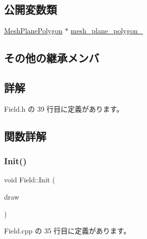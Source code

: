 \subsection*{公開変数類}
\begin{DoxyCompactItemize}
\item 
\mbox{\hyperlink{class_mesh_plane_polygon}{Mesh\+Plane\+Polygon}} $\ast$ \mbox{\hyperlink{class_field_a5c4ad4d2fea2269e7ab2185cf09beb10}{mesh\+\_\+plane\+\_\+polygon\+\_\+}}
\end{DoxyCompactItemize}
\subsection*{その他の継承メンバ}


\subsection{詳解}


 Field.\+h の 39 行目に定義があります。



\subsection{関数詳解}
\mbox{\label{class_field_a8360ab68eaf346984eab8bce4c37c3b3}} 
\subsubsection{\texorpdfstring{Init()}{Init()}}
{\footnotesize\ttfamily void Field\+::\+Init (\begin{DoxyParamCaption}\item[{\mbox{\hyperlink{class_draw_base}{Draw\+Base}} $\ast$}]{draw }\end{DoxyParamCaption})}



 Field.\+cpp の 35 行目に定義があります。

